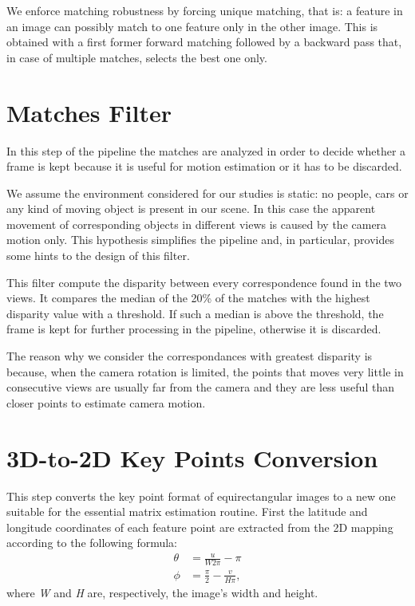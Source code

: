 We enforce matching robustness by forcing unique matching, that is: a feature 
in an image can possibly match to one feature only in the other image.
This is obtained with a first former forward matching followed by a backward 
pass that, in case of multiple matches, selects the best one only.

\section{Matches Filter}
In this step of the pipeline the matches are analyzed in order to decide 
whether a frame is kept because it is useful for motion estimation or 
it has to be discarded.

We assume the environment considered for our studies is static: no people, 
cars or any kind of moving object is present in our scene. In this case the 
apparent movement of corresponding objects in different views is caused by 
the camera motion only. This hypothesis simplifies the pipeline and, 
in particular, provides some hints to the design of this filter.

This filter compute the disparity between every correspondence found in the 
two views. It compares the median of the 20\% of the matches with the highest 
disparity value with a threshold. If such a median is above 
the threshold, the frame is kept for further processing in the pipeline, 
otherwise it is discarded.

The reason why we consider the correspondances with greatest disparity is 
because, when the camera rotation is limited, the points that moves very little 
in consecutive views are usually far from the camera and they are less
useful than closer points to estimate camera motion. 

\section{3D-to-2D Key Points Conversion}
This step converts the key point format of equirectangular images to a new one 
suitable for the essential matrix estimation routine.
First the latitude and longitude coordinates of each feature point are 
extracted from the 2D mapping according to the following formula:
%
\begin{align}
\label{eq:llConversion}
\theta &= \frac{u}{W 2 \pi} - \pi \\
\phi &= \frac{\pi}{2} - \frac{v}{H \pi}\text{,}
\end{align}
%
\noindent where \textit{W} and \textit{H} are, respectively, 
the image's width and height.

